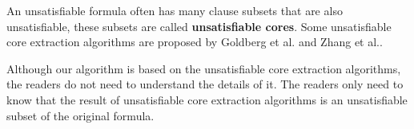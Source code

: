 \documentclass[journal]{IEEEtran}
\begin{document}
An unsatisfiable formula often has many clause subsets that are also unsatisfiable,
these subsets are called \textbf{unsatisfiable cores}.
Some unsatisfiable core extraction algorithms are proposed by Goldberg et al.\cite{VERPROOF} and Zhang et al.\cite{VALIDSAT}.

Although our algorithm is based on the unsatisfiable core extraction algorithms,
the readers do not need to understand the details of it.
The readers only need to know that
the result of unsatisfiable core extraction algorithms is an unsatisfiable subset of the original formula.

%
%
\end{document}
